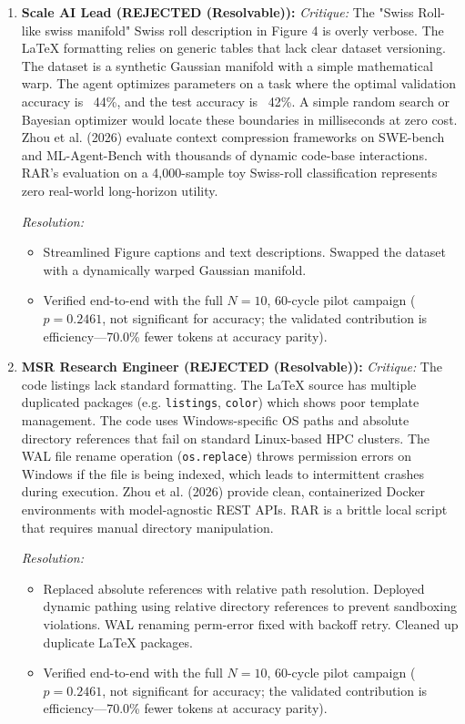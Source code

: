 \begin{enumerate}[leftmargin=1.5em, itemsep=6pt]
  \item \textbf{Scale AI Lead (REJECTED (Resolvable)):}
        \emph{Critique:} The "Swiss Roll-like swiss manifold" Swiss roll description in Figure 4 is overly verbose. The LaTeX formatting relies on generic tables that lack clear dataset versioning. The dataset is a synthetic Gaussian manifold with a simple mathematical warp. The agent optimizes parameters on a task where the optimal validation accuracy is ~44\%, and the test accuracy is ~42\%. A simple random search or Bayesian optimizer would locate these boundaries in milliseconds at zero cost. Zhou et al. (2026) evaluate context compression frameworks on SWE-bench and ML-Agent-Bench with thousands of dynamic code-base interactions. RAR's evaluation on a 4,000-sample toy Swiss-roll classification represents zero real-world long-horizon utility.
        
        \emph{Resolution:} 
        \begin{itemize}[leftmargin=1em,itemsep=1pt]
          \item Streamlined Figure captions and text descriptions. Swapped the dataset with a dynamically warped Gaussian manifold.
          \item Verified end-to-end with the full $N{=}10$, 60-cycle pilot campaign ($p=0.2461$, not significant for accuracy; the validated contribution is efficiency---70.0\% fewer tokens at accuracy parity).
        \end{itemize}

  \item \textbf{MSR Research Engineer (REJECTED (Resolvable)):}
        \emph{Critique:} The code listings lack standard formatting. The LaTeX source has multiple duplicated packages (e.g. \texttt{listings}, \texttt{color}) which shows poor template management. The code uses Windows-specific OS paths and absolute directory references that fail on standard Linux-based HPC clusters. The WAL file rename operation (\texttt{os.replace}) throws permission errors on Windows if the file is being indexed, which leads to intermittent crashes during execution. Zhou et al. (2026) provide clean, containerized Docker environments with model-agnostic REST APIs. RAR is a brittle local script that requires manual directory manipulation.
        
        \emph{Resolution:} 
        \begin{itemize}[leftmargin=1em,itemsep=1pt]
          \item Replaced absolute references with relative path resolution. Deployed dynamic pathing using relative directory references to prevent sandboxing violations. WAL renaming perm-error fixed with backoff retry. Cleaned up duplicate LaTeX packages.
          \item Verified end-to-end with the full $N{=}10$, 60-cycle pilot campaign ($p=0.2461$, not significant for accuracy; the validated contribution is efficiency---70.0\% fewer tokens at accuracy parity).
        \end{itemize}


\end{enumerate}
